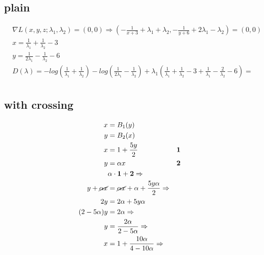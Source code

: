 \documentclass[14pt]{extarticle} %
\begin{document}
 \subsection{plain}
\begin{align*}
  &\nabla L(x,y,z; \lambda_1, \lambda_2) = (0,0) \Rightarrow ( - \frac{1}{x + 3} + \lambda_1 + \lambda_2, 
  - \frac{1}{y+6} + 2 \lambda_1 - \lambda_2)= (0,0)\\
  & x = \frac{1}{\lambda_1} + \frac{1}{\lambda_2}  - 3 \\
  & y = \frac{1}{2\lambda_1} - \frac{1}{\lambda_2}  - 6 \\
  & D(\lambda) = -log(\frac{1}{\lambda_1} + \frac{1}{\lambda_2}) 
  - log(\frac{1}{2\lambda_1} - \frac{1}{\lambda_2} ) + 
  \lambda_1(\frac{1}{\lambda_1} + \frac{1}{\lambda_2}  - 3 + \frac{1}{\lambda_1} - \frac{2}{\lambda_2}  - 6  ) = \\  
\end{align*}
 \subsection{with crossing}
 \begin{align*}
  x &= B_1(y)\\
  y &= B_2(x)\\
  x &= 1 + \frac{5y}{2} & \textbf{1}\\
  y &= \alpha x & \textbf{2} \\ 
  &\alpha \cdot \textbf{1} + \textbf{2} \Rightarrow\\ 
  y + \cancel{ \alpha x } &= \cancel{ \alpha x } + \alpha + \frac{5y\alpha}{2}
  \Rightarrow\\
  2y &= 2\alpha + 5y\alpha\\
  ( 2 - 5 \alpha )y &= 2\alpha \Rightarrow\\
  y &= \frac{ 2\alpha }{ 2 - 5 \alpha }\Rightarrow\\
  x &= 1 + \frac{ 10\alpha }{ 4 - 10 \alpha }\Rightarrow\\
\end{align*}
\end{document}
